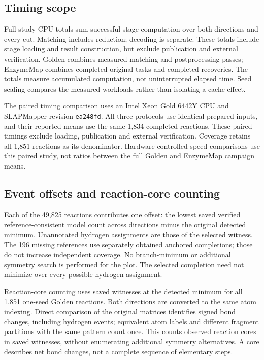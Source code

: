 \subsection{Timing scope}

Full-study CPU totals sum successful stage computation over both directions and every cut. Matching includes reduction; decoding is separate. These totals include stage loading and result construction, but exclude publication and external verification. Golden combines measured matching and postprocessing passes; EnzymeMap combines completed original tasks and completed recoveries. The totals measure accumulated computation, not uninterrupted elapsed time. Seed scaling compares the measured workloads rather than isolating a cache effect.

The paired timing comparison uses an Intel Xeon Gold 6442Y CPU and SLAPMapper revision \texttt{ea248fd}. All three protocols use identical prepared inputs, and their reported means use the same 1,834 completed reactions. These paired timings exclude loading, publication and external verification. Coverage retains all 1,851 reactions as its denominator. Hardware-controlled speed comparisons use this paired study, not ratios between the full Golden and EnzymeMap campaign means.

\subsection{Event offsets and reaction-core counting}

Each of the 49,825 reactions contributes one offset: the lowest saved verified reference-consistent model count across directions minus the original detected minimum. Unannotated hydrogen assignments are those of the selected witness. The 196 missing references use separately obtained anchored completions; those do not increase independent coverage. No branch-minimum or additional symmetry search is performed for the plot. The selected completion need not minimize over every possible hydrogen assignment.

Reaction-core counting uses saved witnesses at the detected minimum for all 1,851 one-seed Golden reactions. Both directions are converted to the same atom indexing. Direct comparison of the original matrices identifies signed bond changes, including hydrogen events; equivalent atom labels and different fragment partitions with the same pattern count once. This counts observed reaction cores in saved witnesses, without enumerating additional symmetry alternatives. A core describes net bond changes, not a complete sequence of elementary steps.

